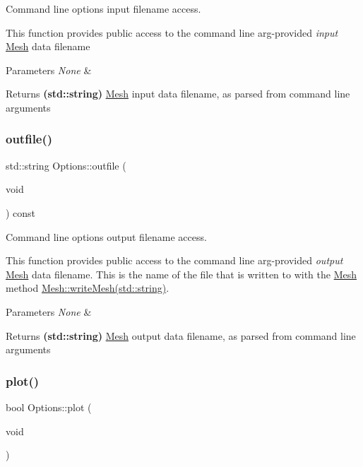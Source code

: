Command line options input filename access. 

This function provides public access to the command line arg-\/provided {\itshape input} \mbox{\hyperlink{class_mesh}{Mesh}} data filename 
\begin{DoxyParams}{Parameters}
{\em None} & \\
\hline
\end{DoxyParams}
\begin{DoxyReturn}{Returns}
{\bfseries (std\+::string)} \mbox{\hyperlink{class_mesh}{Mesh}} input data filename, as parsed from command line arguments 
\end{DoxyReturn}
\mbox{\label{class_options_a35e8029289fef81902b98422e5b9aff8}} 
\subsubsection{\texorpdfstring{outfile()}{outfile()}}
{\footnotesize\ttfamily std\+::string Options\+::outfile (\begin{DoxyParamCaption}\item[{void}]{ }\end{DoxyParamCaption}) const\hspace{0.3cm}{\ttfamily [inline]}}



Command line options output filename access. 

This function provides public access to the command line arg-\/provided {\itshape output} \mbox{\hyperlink{class_mesh}{Mesh}} data filename. This is the name of the file that is written to with the \mbox{\hyperlink{class_mesh}{Mesh}} method \mbox{\hyperlink{class_mesh_a4d194fe4ce2b4fa4c11274c893c6ae29}{Mesh\+::write\+Mesh(std\+::string)}}. 
\begin{DoxyParams}{Parameters}
{\em None} & \\
\hline
\end{DoxyParams}
\begin{DoxyReturn}{Returns}
{\bfseries (std\+::string)} \mbox{\hyperlink{class_mesh}{Mesh}} output data filename, as parsed from command line arguments 
\end{DoxyReturn}
\mbox{\label{class_options_a6d00df300abbec9c39990eb8858f1255}} 
\subsubsection{\texorpdfstring{plot()}{plot()}}
{\footnotesize\ttfamily bool Options\+::plot (\begin{DoxyParamCaption}\item[{void}]{ }\end{DoxyParamCaption})\hspace{0.3cm}{\ttfamily [inline]}}



